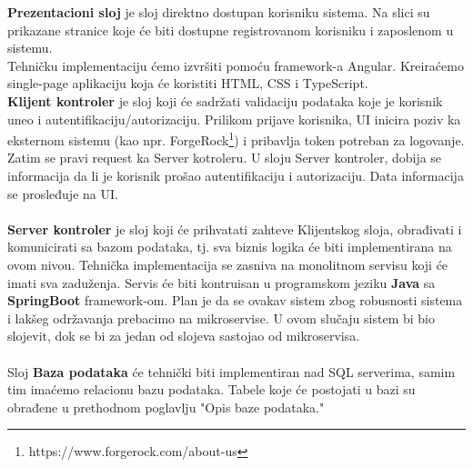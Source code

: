 \documentclass[../main.tex]{subfiles}
\begin{document}
\textbf{Prezentacioni sloj} je sloj direktno dostupan korisniku sistema. Na slici su prikazane stranice koje će biti dostupne registrovanom korisniku i zaposlenom u sistemu. \\
Tehničku implementaciju ćemo izvršiti pomoću framework-a Angular. Kreiraćemo single-page aplikaciju koja će koristiti HTML, CSS i TypeScript. \\
\textbf{Klijent kontroler} je sloj koji će sadržati validaciju podataka koje je korisnik uneo i autentifikaciju/autorizaciju. 
Prilikom prijave korisnika, UI inicira poziv ka eksternom sistemu (kao npr. ForgeRock\footnote{https://www.forgerock.com/about-us}) i pribavlja token potreban za logovanje. Zatim se pravi request ka Server kotroleru. U sloju Server kontroler, dobija se informacija da li je korisnik prošao autentifikaciju i autorizaciju. Data informacija se prosleđuje na UI. \\ \\
\textbf{Server kontroler} je sloj koji će prihvatati zahteve Klijentskog sloja, obrađivati i komunicirati sa bazom podataka, tj. sva biznis logika će biti implementirana na ovom nivou.
Tehnička implementacija se zasniva na monolitnom servisu koji će imati sva zaduženja. Servis će biti kontruisan u programskom jeziku \textbf{Java} sa \textbf{SpringBoot} framework-om. 
Plan je da se ovakav sistem zbog robusnosti sistema i lakšeg održavanja prebacimo na mikroservise. U ovom slučaju sistem bi bio slojevit, dok se bi za jedan od slojeva sastojao od mikroservisa.
\\ \\
Sloj \textbf{Baza podataka} će tehnički biti implementiran nad SQL serverima, samim tim imaćemo relacionu bazu podataka. Tabele koje će postojati u bazi su obrađene u prethodnom poglavlju "Opis baze podataka."
\end{document}
